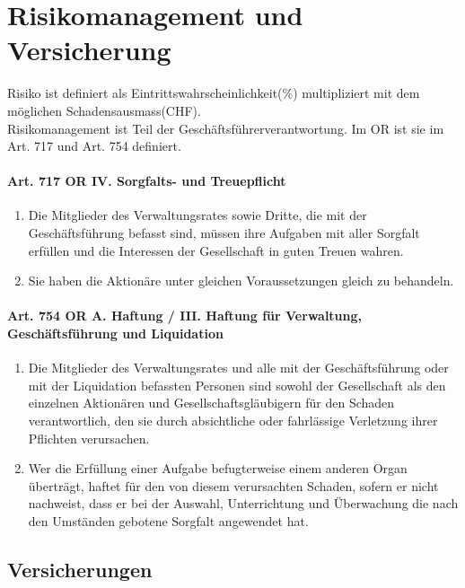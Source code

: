 \section{Risikomanagement und Versicherung}

Risiko ist definiert als Eintrittswahrscheinlichkeit(\%) multipliziert mit
dem möglichen Schadensausmass(CHF).\\

Risikomanagement ist Teil der Geschäftsführerverantwortung. Im OR ist sie im
Art. 717 und Art. 754 definiert.

\paragraph{Art. 717 OR IV. Sorgfalts- und Treuepflicht}
\label{sec:RisikoMgmt-SorfaltTreuePflicht}
\begin{enumerate}
	\tightlist
	\item Die Mitglieder des Verwaltungsrates sowie Dritte, die mit der
	Geschäftsführung befasst sind, müssen ihre Aufgaben mit aller Sorgfalt
	erfüllen und die Interessen der Gesellschaft in guten Treuen wahren.
	\item Sie haben die Aktionäre unter gleichen Voraussetzungen gleich zu
	behandeln.
\end{enumerate}

\paragraph{Art. 754 OR A. Haftung / III. Haftung für Verwaltung,
Geschäftsführung und Liquidation}
\label{sec:RisikoMgmt-HaftungVerwaltung}
\begin{enumerate}
	\tightlist
	\item Die Mitglieder des Verwaltungsrates und alle mit der Geschäftsführung
	oder mit der Liquidation befassten Personen sind sowohl der Gesellschaft als
	den einzelnen Aktionären und Gesellschaftsgläubigern für den Schaden
	verantwortlich, den sie durch absichtliche oder fahrlässige Verletzung ihrer
	Pflichten verursachen.
	\item Wer die Erfüllung einer Aufgabe befugterweise einem anderen Organ
	überträgt, haftet für den von diesem verursachten Schaden, sofern er nicht
	nachweist, dass er bei der Auswahl, Unterrichtung und Überwachung die nach
	den Umständen gebotene Sorgfalt angewendet hat.
\end{enumerate}

\subsection{Versicherungen}

